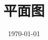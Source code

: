 \documentclass[a4paper]{ctexart}
\date{\today}
\title{平面图}
\begin{document}
    \header
    
\end{document}
